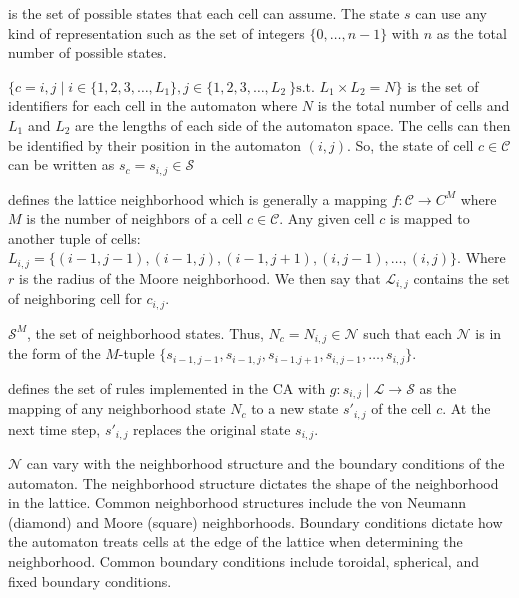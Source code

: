 \begin{CAdef}
    \itemS is the set of possible states that each cell can assume. The state $s$ can use any kind of representation such as the set of integers $\lbrace 0,\ldots,n-1\rbrace$ with $n$ as the total number of possible states.
    
    \itemC $\lbrace c = {i,j} \mid i \in \lbrace 1,2,3,\dots,L_1 \rbrace, j \in \lbrace 1,2,3,\dots,L_2\ \rbrace \text{s.t. } L_1 \times L_2 = N \rbrace$ is the set of identifiers for each cell in the automaton where $N$ is the total number of cells and $L_1$ and $L_2$ are the lengths of each side of the automaton space. The cells can then be identified by their position in the automaton $(i,j)$. So, the state of cell $c \in \mathcal{C}$ can be written as $s_c = s_{i,j} \in \mathcal{S}$
    
    \itemL defines the lattice neighborhood which is generally a mapping $f : \mathcal{C} \rightarrow C^M$ where $M$ is the number of neighbors of a cell $c \in \mathcal{C}$. 
    Any given cell $c$ is mapped to another tuple of cells: $L_{i,j} = \lbrace (i-1,j-1), (i-1, j), (i-1, j+1), (i, j-1), \dots, (i,j) \rbrace$. 
    Where $r$ is the radius of the Moore neighborhood. We then say that $\mathcal{L}_{i,j}$ contains the set of neighboring cell for $c_{i,j}$.
    
    \itemN $\mathcal{S}^M$, the set of neighborhood states. Thus, $N_c = N_{i,j} \in \mathcal{N}$ such that each $\mathcal{N}$ is in the form of the $M$-tuple $\lbrace s_{i-1,j-1}, s_{i-1, j}, s_{i-1. j+1}, s_{i, j-1}, \dots, s_{i,j} \rbrace$.
    
    \itemR defines the set of rules implemented in the CA with $g : s_{i,j} \mid \mathcal{L} \rightarrow \mathcal{S}$ as the mapping of any neighborhood state $N_c$ to a new state $s'_{i,j}$ of the cell $c$. At the next time step, $s'_{i,j}$ replaces the original state $s_{i,j}$.
\end{CAdef}

$\mathcal{N}$ can vary with the neighborhood structure and the boundary conditions of the automaton. 
The neighborhood structure dictates the shape of the neighborhood in the lattice. 
Common neighborhood structures include the von Neumann (diamond) and Moore (square) neighborhoods. 
Boundary conditions dictate how the automaton treats cells at the edge of the lattice when determining the neighborhood. 
Common boundary conditions include toroidal, spherical, and fixed boundary conditions. 

